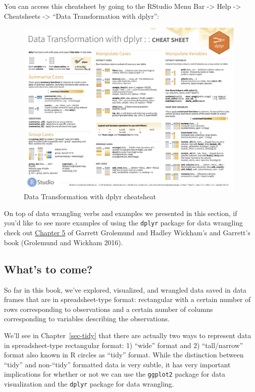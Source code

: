 \documentclass[
  letterpaper,
  DIV=11,
  numbers=noendperiod]{scrreprt}
\theoremstyle{definition}
\theoremstyle{remark}
\begin{document}
You can access this cheatsheet by going to the RStudio Menu Bar
-\textgreater{} Help -\textgreater{} Cheatsheets -\textgreater{} ``Data
Transformation with dplyr'':

\begin{figure}

{\centering \includegraphics{images/dplyr_cheatsheet-1.png}

}

\caption{Data Transformation with dplyr cheatsheat}

\end{figure}

On top of data wrangling verbs and examples we presented in this
section, if you'd like to see more examples of using the \texttt{dplyr}
package for data wrangling check out
\href{http://r4ds.had.co.nz/transform.html}{Chapter 5} of Garrett
Grolemund and Hadley Wickham's and Garrett's book (Grolemund and Wickham
2016).

\hypertarget{whats-to-come}{%
\subsection{What's to come?}\label{whats-to-come}}

So far in this book, we've explored, visualized, and wrangled data saved
in data frames that are in spreadsheet-type format: rectangular with a
certain number of rows corresponding to observations and a certain
number of columns corresponding to variables describing the
observations.

We'll see in Chapter~\ref{sec-tidy} that there are actually two ways to
represent data in spreadsheet-type rectangular format: 1) ``wide''
format and 2) ``tall/narrow'' format also known in R circles as ``tidy''
format. While the distinction between ``tidy'' and non-``tidy''
formatted data is very subtle, it has very important implications for
whether or not we can use the \texttt{ggplot2} package for data
visualization and the \texttt{dplyr} package for data wrangling.
\end{document}
